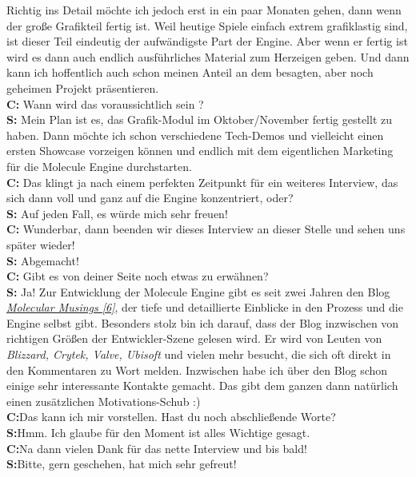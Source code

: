 \documentclass[10pt,a4paper,ngerman,twoside]{article} %
\begin{document}
Richtig ins Detail möchte ich jedoch erst in ein paar Monaten gehen, dann wenn der große Grafikteil fertig ist. Weil heutige Spiele einfach extrem grafiklastig sind, ist dieser Teil eindeutig der aufwändigste Part der Engine. Aber wenn er fertig ist wird es dann auch endlich ausführliches Material zum Herzeigen geben. Und dann kann ich hoffentlich auch schon meinen Anteil an dem besagten, aber noch geheimen Projekt präsentieren. \\
\textbf{C:} Wann wird das voraussichtlich sein ? \\
\textbf{S:} Mein Plan ist es, das Grafik-Modul im Oktober/November fertig gestellt zu haben. Dann möchte ich schon verschiedene Tech-Demos und vielleicht einen ersten Showcase vorzeigen können und endlich mit dem eigentlichen Marketing für die Molecule Engine durchstarten. \\
\textbf{C:} Das klingt ja nach einem perfekten Zeitpunkt für ein weiteres Interview, das sich dann voll und ganz auf die Engine konzentriert, oder? \\
\textbf{S:} Auf jeden Fall, es würde mich sehr freuen! \\
\textbf{C:} Wunderbar, dann beenden wir dieses Interview an dieser Stelle und sehen uns später wieder!\\
\textbf{S:} Abgemacht! \\
\textbf{C:} Gibt es von deiner Seite noch etwas zu erwähnen? \\
\textbf{S:} Ja! Zur Entwicklung der Molecule Engine gibt es seit zwei Jahren den Blog \href{http://molecularmusings.wordpress.com/}{\textit{Molecular Musings [6]}}, der tiefe und detaillierte Einblicke in den Prozess und die Engine selbst gibt. Besonders stolz bin ich darauf, dass der Blog inzwischen von richtigen Größen der Entwickler-Szene gelesen wird. Er wird von Leuten von \textit{Blizzard, Crytek, Valve, Ubisoft} und vielen mehr besucht, die sich oft direkt in den Kommentaren zu Wort melden. Inzwischen habe ich über den Blog schon einige sehr interessante Kontakte gemacht. Das gibt dem ganzen dann natürlich einen zusätzlichen Motivations-Schub :) \\
\textbf{C:}Das kann ich mir vorstellen. Hast du noch abschließende Worte? \\
\textbf{S:}Hmm. Ich glaube für den Moment ist alles Wichtige gesagt. \\
\textbf{C:}Na dann vielen Dank für das nette Interview und bis bald! \\
\textbf{S:}Bitte, gern geschehen, hat mich sehr gefreut! \\
\end{document}
